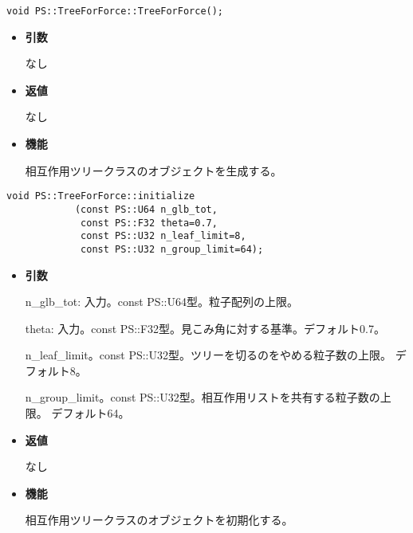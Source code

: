 
\begin{screen}
\begin{verbatim}
void PS::TreeForForce::TreeForForce();
\end{verbatim}
\end{screen}

\begin{itemize}

\item {\bf 引数}

なし

\item {\bf 返値}

なし

\item {\bf 機能}

相互作用ツリークラスのオブジェクトを生成する。

\end{itemize}


\begin{screen}
\begin{verbatim}
void PS::TreeForForce::initialize
            (const PS::U64 n_glb_tot,
             const PS::F32 theta=0.7,
             const PS::U32 n_leaf_limit=8,
             const PS::U32 n_group_limit=64);
\end{verbatim}
\end{screen}

\begin{itemize}

\item {\bf 引数}

n\_glb\_tot: 入力。const PS::U64型。粒子配列の上限。

theta: 入力。const PS::F32型。見こみ角に対する基準。デフォルト0.7。

n\_leaf\_limit。const PS::U32型。ツリーを切るのをやめる粒子数の上限。
デフォルト8。

n\_group\_limit。const PS::U32型。相互作用リストを共有する粒子数の上限。
デフォルト64。

\item {\bf 返値}

なし

\item {\bf 機能}

相互作用ツリークラスのオブジェクトを初期化する。

\end{itemize}




